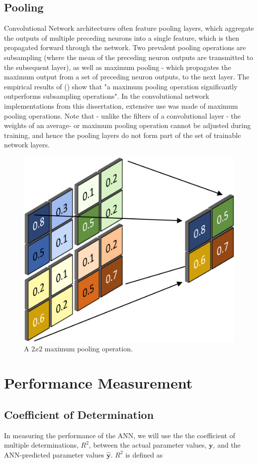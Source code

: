\documentclass[11pt,oneside,openany,a4paper,english, report, goldenblock
]{usthesis}
\begin{document}
\subsection{Pooling}
Convolutional Network architectures often feature pooling layers, which aggregate the outputs of multiple preceding neurons into a single feature, which is then propagated forward through the network. Two prevalent pooling operations are subsampling (where the mean of the preceding neuron outputs are transmitted to the subsequent layer), as well as maximum pooling - which propagates the maximum output from a set of preceding neuron outputs, to the next layer. The empirical results of  (\citeyear{Scherer2010}) show that "a maximum pooling operation significantly outperforms subsampling operations". In the convolutional network implementations from this dissertation, extensive use was made of maximum pooling operations. Note that - unlike the filters of a convolutional layer - the weights of an average- or maximum pooling operation cannot be adjusted during training, and hence the pooling layers do not form part of the set of trainable network layers.

\begin{figure}[h]
	\centering
	\includegraphics[width=0.4\linewidth]{Max-Pooling_Operation}
	\caption[A $2x2$ maximum pooling operation.]{A $2x2$ maximum pooling operation.}
	\label{fig:max-poolingoperation}
\end{figure}


\section{Performance Measurement}
\subsection{Coefficient of Determination}
In measuring the performance of the ANN, we will use the the coefficient of multiple determinations, $ R^2 $, between the actual parameter values, $ \mathbf{y} $, and the ANN-predicted parameter values $ \mathbf{\hat{y}}$. $ R^2 $ is defined as
\end{document}
